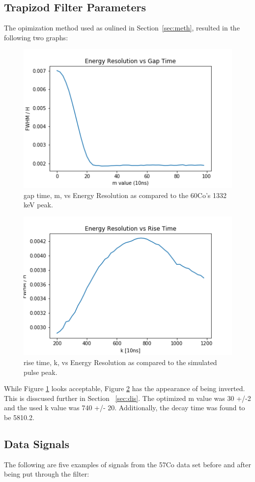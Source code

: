 \subsection{Trapizod Filter Parameters}
The opimization method used as oulined in Section~\ref{sec:meth}, resulted in the following two graphs:

\begin{figure}[!htb]
\centering
\includegraphics[width=0.7\linewidth]{images/RvsM.png}
\caption{ gap time, m, vs Energy Resolution as compared to the ${60}$Co's 1332 keV peak.}
\label{fig:MvsER}
\end{figure}


\begin{figure}[!htb]
\centering
\includegraphics[width=0.75\linewidth]{images/RvsK_main.png}
\caption{ rise time, k, vs Energy Resolution as compared to the simulated pulse peak.}
\label{fig:kvsER}
\end{figure}


While Figure \ref{fig:MvsER} looks acceptable, Figure \ref{fig:kvsER} has the appearance of being inverted. This is disscused further in Section ~\ref{sec:dis}. 
The optimized m value was 30 +/-2 and the used k value was 740 +/- 20.
Additionally, the decay time was found to be 5810.2.

\subsection{Data Signals}
The following are five examples of signals from the 57Co data set before and after being put through the filter:

